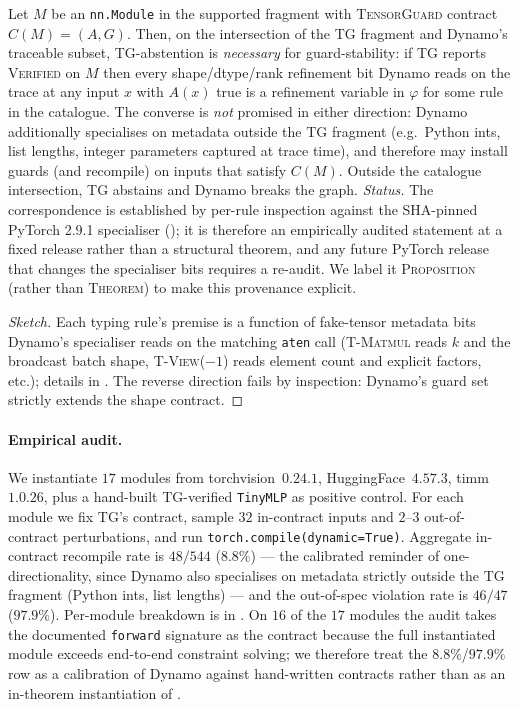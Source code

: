 \begin{proposition}
\label{thm:dynamo-corr}
Let $M$ be an \texttt{nn.Module} in the supported fragment with
\textsc{TensorGuard} contract $C(M)=(A,G)$. Then, on the
intersection of the \textsc{TG} fragment and Dynamo's traceable
subset, \textsc{TG}-abstention is \emph{necessary} for
guard-stability: if \textsc{TG} reports \textsc{Verified} on
$M$ then every shape/dtype/rank refinement bit Dynamo reads on
the trace at any input $x$ with $A(x)$ true is a refinement
variable in $\varphi$ for some rule in the 
catalogue. The converse is \emph{not} promised in either
direction: Dynamo additionally specialises on
metadata outside the \textsc{TG} fragment (e.g.\ Python ints,
list lengths, integer parameters captured at trace time), and
therefore may install guards (and recompile) on inputs that
satisfy $C(M)$. Outside the catalogue intersection,
\textsc{TG} abstains and Dynamo breaks the graph.
\emph{Status.} The correspondence is established by per-rule
inspection against the SHA-pinned PyTorch 2.9.1 specialiser
(); it is therefore an empirically
audited statement at a fixed release rather than a structural
theorem, and any future PyTorch release that changes the
specialiser bits requires a re-audit. We label it
\textsc{Proposition} (rather than \textsc{Theorem}) to make
this provenance explicit.
\end{proposition}
\begin{proof}[Sketch]
Each typing rule's premise is a function of fake-tensor metadata
bits Dynamo's specialiser reads on the matching
\texttt{aten} call (\textsc{T-Matmul} reads $k$ and the broadcast
batch shape, \textsc{T-View($-1$)} reads element count and
explicit factors, etc.); details in .
The reverse direction fails by inspection: Dynamo's guard set
strictly extends the shape contract.
\end{proof}

\paragraph{Empirical audit.}
We instantiate $17$ modules from torchvision~$0.24.1$,
HuggingFace~$4.57.3$, timm~$1.0.26$, plus a hand-built
\textsc{TG}-verified \texttt{TinyMLP} as positive control.
For each module we fix \textsc{TG}'s contract, sample $32$
in-contract inputs and $2$--$3$ out-of-contract perturbations,
and run \texttt{torch.compile(dynamic=True)}. Aggregate
in-contract recompile rate is $48/544$ ($8.8\%$) --- the
calibrated reminder of one-directionality, since Dynamo also
specialises on metadata strictly outside the \textsc{TG}
fragment (Python ints, list lengths) --- and the
out-of-spec violation rate is $46/47$ ($97.9\%$). Per-module
breakdown is in . On $16$ of the $17$
modules the audit takes the documented \texttt{forward}
signature as the contract because the full instantiated module
exceeds end-to-end constraint solving; we therefore treat the
$8.8\%$/$97.9\%$ row as a calibration of Dynamo against
hand-written contracts rather than as an in-theorem
instantiation of .

